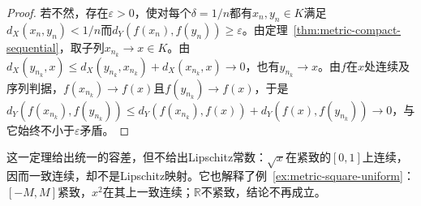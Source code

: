 \begin{proof}
若不然，存在$\varepsilon>0$，使对每个$\delta=1/n$都有$x_n,y_n\in K$满足$d_X(x_n,y_n)<1/n$而$d_Y(f(x_n),f(y_n))\geq\varepsilon$。由定理~\ref{thm:metric-compact-sequential}，取子列$x_{n_k}\to x\in K$。由$d_X(y_{n_k},x)\leq d_X(y_{n_k},x_{n_k})+d_X(x_{n_k},x)\to0$，也有$y_{n_k}\to x$。由$f$在$x$处连续及序列判据，$f(x_{n_k})\to f(x)$且$f(y_{n_k})\to f(x)$，于是$d_Y(f(x_{n_k}),f(y_{n_k}))\leq d_Y(f(x_{n_k}),f(x))+d_Y(f(x),f(y_{n_k}))\to0$，与它始终不小于$\varepsilon$矛盾。
\end{proof}

这一定理给出统一的容差，但不给出Lipschitz常数：$\sqrt x$在紧致的$[0,1]$上连续，因而一致连续，却不是Lipschitz映射。它也解释了例~\ref{ex:metric-square-uniform}：$[-M,M]$紧致，$x^2$在其上一致连续；$\mathbb R$不紧致，结论不再成立。
